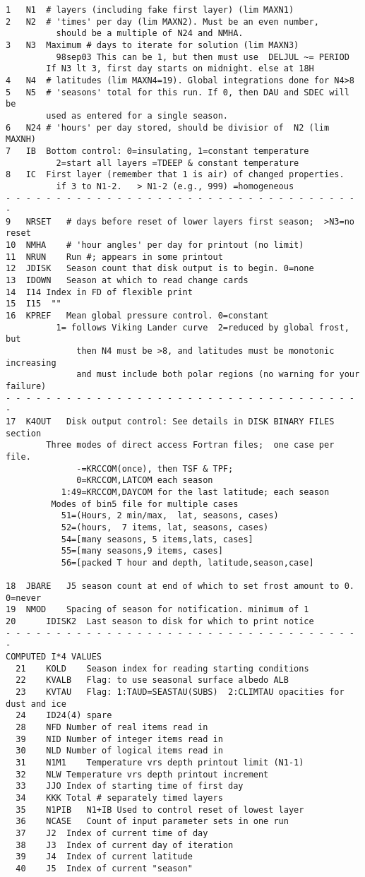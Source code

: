 \begin{verbatim}
1	N1	# layers (including fake first layer) (lim MAXN1)
2	N2	# 'times' per day (lim MAXN2). Must be an even number, 
		  should be a multiple of N24 and NMHA.
3	N3	Maximum # days to iterate for solution (lim MAXN3)
		  98sep03 This can be 1, but then must use  DELJUL ~= PERIOD
		If N3 lt 3, first day starts on midnight. else at 18H 
4	N4	# latitudes (lim MAXN4=19). Global integrations done for N4>8
5	N5	# 'seasons' total for this run. If 0, then DAU and SDEC will be 
		used as entered for a single season.
6	N24	# 'hours' per day stored, should be divisior of  N2 (lim MAXNH)
7	IB	Bottom control: 0=insulating, 1=constant temperature 
		  2=start all layers =TDEEP & constant temperature 
8	IC	First layer (remember that 1 is air) of changed properties. 
		  if 3 to N1-2.   > N1-2 (e.g., 999) =homogeneous
- - - - - - - - - - - - - - - - - - - - - - - - - - - - - - - - - - - - 
9	NRSET	# days before reset of lower layers first season;  >N3=no reset
10	NMHA	# 'hour angles' per day for printout (no limit)
11	NRUN	Run #; appears in some printout
12	JDISK	Season count that disk output is to begin. 0=none
13	IDOWN	Season at which to read change cards
14	I14	Index in FD of flexible print
15	I15	 ""
16	KPREF	Mean global pressure control. 0=constant
	      1= follows Viking Lander curve  2=reduced by global frost, but
              then N4 must be >8, and latitudes must be monotonic increasing
              and must include both polar regions (no warning for your failure)
- - - - - - - - - - - - - - - - - - - - - - - - - - - - - - - - - - - - 
17	K4OUT	Disk output control: See details in DISK BINARY FILES section
		Three modes of direct access Fortran files;  one case per file.
		      -=KRCCOM(once), then TSF & TPF;
		      0=KRCCOM,LATCOM each season
		   1:49=KRCCOM,DAYCOM for the last latitude; each season
		 Modes of bin5 file for multiple cases
		   51=(Hours, 2 min/max,  lat, seasons, cases)
		   52=(hours,  7 items, lat, seasons, cases)
		   54=[many seasons, 5 items,lats, cases]
		   55=[many seasons,9 items, cases]
		   56=[packed T hour and depth, latitude,season,case]

18	JBARE	J5 season count at end of which to set frost amount to 0. 0=never
19	NMOD	Spacing of season for notification. minimum of 1
20      IDISK2  Last season to disk for which to print notice
- - - - - - - - - - - - - - - - - - - - - - - - - - - - - - - - - - - - 
COMPUTED I*4 VALUES
  21	KOLD    Season index for reading starting conditions
  22    KVALB   Flag: to use seasonal surface albedo ALB
  23    KVTAU   Flag: 1:TAUD=SEASTAU(SUBS)  2:CLIMTAU opacities for dust and ice
  24    ID24(4) spare
  28	NFD	Number of real items read in
  39	NID	Number of integer items read in
  30	NLD	Number of logical items read in
  31	N1M1	Temperature vrs depth printout limit (N1-1)
  32	NLW	Temperature vrs depth printout increment
  33	JJO	Index of starting time of first day
  34	KKK	Total # separately timed layers
  35	N1PIB	N1+IB Used to control reset of lowest layer
  36	NCASE	Count of input parameter sets in one run
  37	J2	Index of current time of day
  38	J3	Index of current day of iteration
  39	J4	Index of current latitude
  40	J5	Index of current "season"


\end{verbatim}
